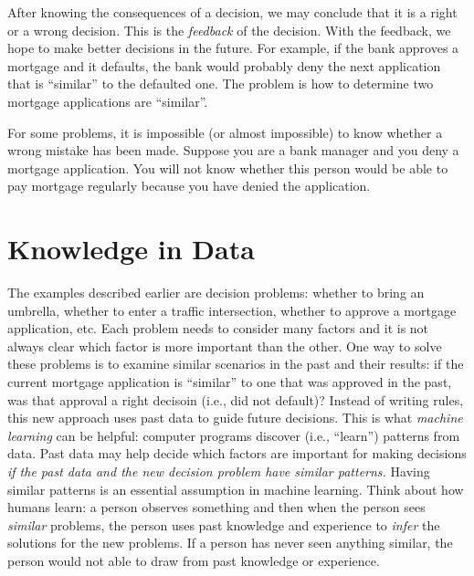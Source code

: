 
After knowing the consequences of a decision, we may conclude that it
is a right or a wrong decision. This is the {\it feedback} of the
decision.  With the feedback, we hope to make better decisions in the
future. For example, if the bank approves a mortgage and it defaults,
the bank would probably deny the next application that is ``similar''
to the defaulted one.  The problem is how to determine two mortgage
applications are ``similar''.

For some problems, it is impossible (or almost impossible) to know
whether a wrong mistake has been made. Suppose you are a bank manager
and you deny a mortgage application. You will not know whether this
person would be able to pay mortgage regularly because you have denied
the application.



\section{Knowledge in Data}




The examples described earlier are decision problems: whether to bring
an umbrella, whether to enter a traffic intersection, whether to
approve a mortgage application, etc. Each problem needs to consider
many factors and it is not always clear which factor is more important
than the other. One way to solve these problems is to examine similar
scenarios in the past and their results: if the current mortgage
application is ``similar'' to one that was approved in the past, was
that approval a right decisoin (i.e., did not default)?  Instead of
writing rules, this new approach uses past data to guide future
decisions.  This is what {\it machine learning} can be helpful:
computer programs discover (i.e., ``learn'') patterns from data.  Past
data may help decide which factors are important for making decisions
{\it if the past data and the new decision problem have similar
  patterns.}  Having similar patterns is an essential assumption in
machine learning.  Think about how humans learn: a person observes
something and then when the person sees {\it similar} problems, the
person uses past knowledge and experience to {\it infer} the solutions
for the new problems.  If a person has never seen anything similar,
the person would not able to draw from past knowledge or experience.

